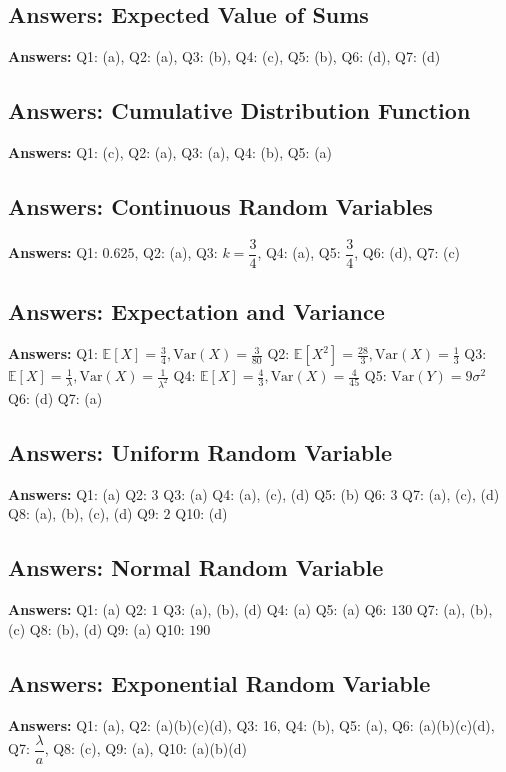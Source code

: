 \subsection*{Answers: Expected Value of Sums}
\noindent\textbf{Answers:} Q1: (a), Q2: (a), Q3: (b), Q4: (c), Q5: (b), Q6: (d), Q7: (d)

\subsection*{Answers: Cumulative Distribution Function}
\noindent\textbf{Answers:} Q1: (c), Q2: (a), Q3: (a), Q4: (b), Q5: (a)

\subsection*{Answers: Continuous Random Variables}
\noindent\textbf{Answers:}  
Q1: $0.625$,  
Q2: (a),  
Q3: $k = \dfrac{3}{4}$,  
Q4: (a),  
Q5: $\dfrac{3}{4}$,  
Q6: (d),  
Q7: (c)

\subsection*{Answers: Expectation and Variance}
\noindent\textbf{Answers:}  
Q1: $\mathbb{E}[X] = \frac{3}{4}, \text{Var}(X) = \frac{3}{80}$  
Q2: $\mathbb{E}[X^2] = \frac{28}{3}, \text{Var}(X) = \frac{1}{3}$  
Q3: $\mathbb{E}[X] = \frac{1}{\lambda}, \text{Var}(X) = \frac{1}{\lambda^2}$  
Q4: $\mathbb{E}[X] = \frac{4}{3}, \text{Var}(X) = \frac{4}{45}$  
Q5: $\text{Var}(Y) = 9\sigma^2$  
Q6: (d)  
Q7: (a)

\subsection*{Answers: Uniform Random Variable}
\noindent\textbf{Answers:}  
Q1: (a)  
Q2: $3$  
Q3: (a)  
Q4: (a), (c), (d)  
Q5: (b)  
Q6: $3$  
Q7: (a), (c), (d)  
Q8: (a), (b), (c), (d)  
Q9: $2$  
Q10: (d)

\subsection*{Answers: Normal Random Variable}
\noindent\textbf{Answers:}  
Q1: (a)  
Q2: $1$  
Q3: (a), (b), (d)  
Q4: (a)  
Q5: (a)  
Q6: $130$  
Q7: (a), (b), (c)  
Q8: (b), (d)  
Q9: (a)  
Q10: $190$

\subsection*{Answers: Exponential Random Variable}
\noindent\textbf{Answers:} Q1: (a), Q2: (a)(b)(c)(d), Q3: 16, Q4: (b), Q5: (a), Q6: (a)(b)(c)(d), Q7: $\dfrac{\lambda}{a}$, Q8: (c), Q9: (a), Q10: (a)(b)(d)

